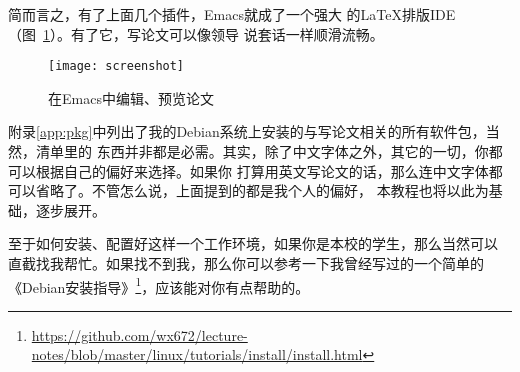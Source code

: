简而言之，有了上面几个插件，Emacs就成了一个强大
的\LaTeX{}排版IDE（图~\ref{fig:screenshot}）。有了它，写论文可以像领导
说套话一样顺滑流畅。

\begin{figure}[ht]
  \centering
    \texttt{[image: screenshot]}
    \caption{在Emacs中编辑、预览论文\label{fig:screenshot}}  
\end{figure}

附录\ref{app:pkg}中列出了我的Debian系统上安装的与写论文相关的所有软件包，当然，清单里的
东西并非都是必需。其实，除了中文字体之外，其它的一切，你都可以根据自己的偏好来选择。如果你
打算用英文写论文的话，那么连中文字体都可以省略了。不管怎么说，上面提到的都是我个人的偏好，
本教程也将以此为基础，逐步展开。

至于如何安装、配置好这样一个工作环境，如果你是本校的学生，那么当然可以
直截找我帮忙。如果找不到我，那么你可以参考一下我曾经写过的一个简单的%
《Debian安装指导》\footnote{%
  \url{https://github.com/wx672/lecture-notes/blob/master/linux/tutorials/install/install.html}}，应该能对你有点帮助的。


